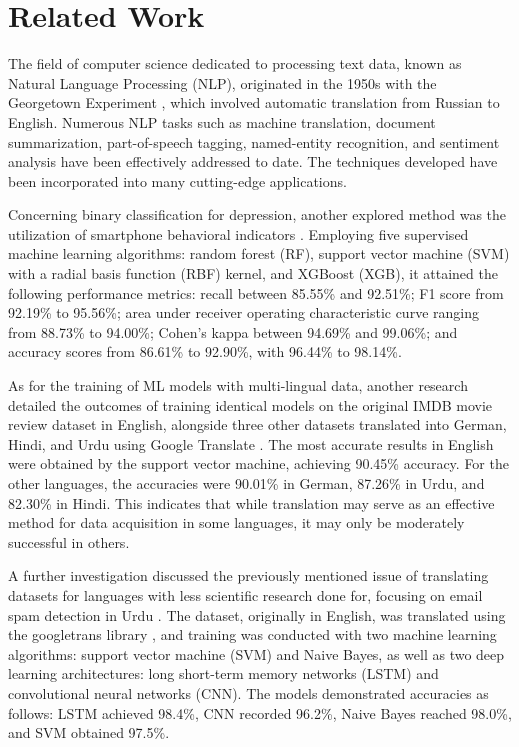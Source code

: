 \section{Related Work}

\quad The field of computer science dedicated to processing text data, known as Natural Language Processing (NLP), originated in the 1950s with the Georgetown Experiment \cite{hutchins2004georgetown}, which involved automatic translation from Russian to English. Numerous NLP tasks such as machine translation, document summarization, part-of-speech tagging, named-entity recognition, and sentiment analysis have been effectively addressed to date. The techniques developed have been incorporated into many cutting-edge applications. 

Concerning binary classification for depression, another explored method was the utilization of smartphone behavioral indicators \cite{opoku2021predicting}. Employing five supervised machine learning algorithms: random forest (RF), support vector machine (SVM) with a radial basis function (RBF) kernel, and XGBoost (XGB), it attained the following performance metrics: recall between 85.55\% and 92.51\%; F1 score from 92.19\% to 95.56\%; area under receiver operating characteristic curve ranging from 88.73\% to 94.00\%; Cohen's kappa between 94.69\% and 99.06\%; and accuracy scores from 86.61\% to 92.90\%, with 96.44\% to 98.14\%.

As for the training of ML models with multi-lingual data, another research detailed the outcomes of training identical models on the original IMDB movie review dataset in English, alongside three other datasets translated into German, Hindi, and Urdu using Google Translate \cite{ghafoor2021impact}. The most accurate results in English were obtained by the support vector machine, achieving 90.45\% accuracy. For the other languages, the accuracies were 90.01\% in German, 87.26\% in Urdu, and 82.30\% in Hindi. This indicates that while translation may serve as an effective method for data acquisition in some languages, it may only be moderately successful in others.


A further investigation discussed the previously mentioned issue of translating datasets for languages with less scientific research done for, focusing on email spam detection in Urdu \cite{siddique2021machine}. The dataset, originally in English, was translated using the googletrans library \cite{googletranslib}, and training was conducted with two machine learning algorithms: support vector machine (SVM) and Naive Bayes, as well as two deep learning architectures: long short-term memory networks (LSTM) and convolutional neural networks (CNN). The models demonstrated accuracies as follows: LSTM achieved 98.4\%, CNN recorded 96.2\%, Naive Bayes reached 98.0\%, and SVM obtained 97.5\%.

